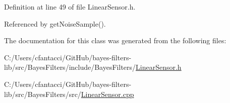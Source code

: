 Definition at line 49 of file Linear\+Sensor.\+h.



Referenced by get\+Noise\+Sample().



The documentation for this class was generated from the following files\+:\begin{DoxyCompactItemize}
\item 
C\+:/\+Users/cfantacci/\+Git\+Hub/bayes-\/filters-\/lib/src/\+Bayes\+Filters/include/\+Bayes\+Filters/\mbox{\hyperlink{LinearSensor_8h}{Linear\+Sensor.\+h}}\item 
C\+:/\+Users/cfantacci/\+Git\+Hub/bayes-\/filters-\/lib/src/\+Bayes\+Filters/src/\mbox{\hyperlink{LinearSensor_8cpp}{Linear\+Sensor.\+cpp}}\end{DoxyCompactItemize}
